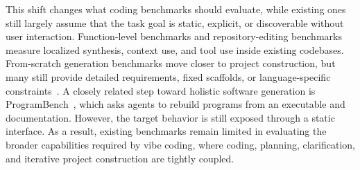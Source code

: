 
This shift changes what coding benchmarks should evaluate, while existing ones still largely assume that the task goal is static, explicit, or discoverable without user interaction. Function-level benchmarks and repository-editing benchmarks measure localized synthesis, context use, and tool use inside existing codebases. From-scratch generation benchmarks move closer to project construction, but many still provide detailed requirements, fixed scaffolds, or language-specific constraints~\cite{zhao2024commit0,ding2026nl2repobench,fu2025prdbench}. 
A closely related step toward holistic software generation is ProgramBench~\cite{yang2026programbench}, which asks agents to rebuild programs from an executable and documentation. However, the target behavior is still exposed through a static interface. As a result, existing benchmarks remain limited in evaluating the broader capabilities required by vibe coding, where coding, planning, clarification, and iterative project construction are tightly coupled.


